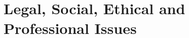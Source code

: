 \documentclass[a4paper,fleqn,12pt]{article}
\begin{document}
\section{Legal, Social, Ethical and Professional Issues}



\end{document}
